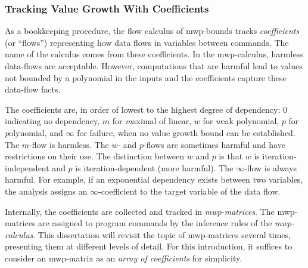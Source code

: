 \subsubsection{Tracking Value Growth With Coefficients}

As a bookkeeping procedure, the flow calculus of mwp-bounds tracks
\emph{coefficients} (or \enquote{flows}) representing how data flows in variables between commands.
The name of the calculus comes from these coefficients.
In the mwp-calculus, harmless data-flows are acceptable.
However, computations that are harmful lead to values not bounded by a polynomial in the inputs and the coefficients capture these data-flow facts.

The coefficients are, in order of lowest to the highest degree of dependency:
\({0}\) indicating no dependency,
\({m}\) for \emph{m}aximal of linear,
\({w}\) for \emph{w}eak polynomial,
\({p}\) for \emph{p}olynomial, and
\({\infty}\) for failure, when no value growth bound can be established.
\noindent The \(m\)-flow is harmless.
The \(w\)- and \(p\)-flows are sometimes harmful and have restrictions on their use.
The distinction between \(w\) and \(p\) is that \(w\) is
iteration-independent and \(p\) is
iteration-dependent (more harmful).
The \(\infty\)-flow is always harmful.
For example, if an exponential dependency exists between two variables,
the analysis assigns an \(\infty\)-coefficient to the target variable of the data flow.

Internally, the coefficients are collected and tracked in \emph{mwp-matrices}.
The mwp-matrices are assigned to program commands by the inference rules of the \emph{mwp-calculus}.
This dissertation will revisit the topic of mwp-matrices several times, presenting them at different levels of detail.
For this introduction, it suffices to consider an mwp-matrix as an \emph{array of coefficients} for simplicity.

